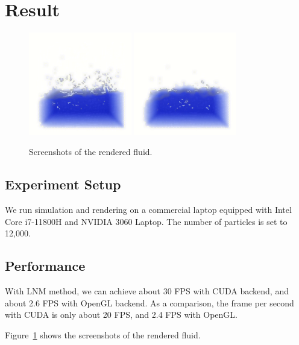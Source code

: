 \documentclass[sigconf]{acmart}
\begin{document}
\section{Result}
\begin{figure}[htb]
  \centering
  \includegraphics[width=0.4\textwidth]{result-1.png}
  \hspace{5em}
  \includegraphics[width=0.4\textwidth]{result-2.png}
  \caption{Screenshots of the rendered fluid.}
  \label{rendered-result}
\end{figure}

\subsection{Experiment Setup}
We run simulation and rendering on a commercial laptop equipped with Intel Core i7-11800H and NVIDIA 3060 Laptop. The number of particles is set to 12,000.

\subsection{Performance}
With LNM method, we can achieve about 30 FPS with CUDA backend, and about 2.6 FPS with OpenGL backend. As a comparison, the frame per second with CUDA is only about 20 FPS, and 2.4 FPS with OpenGL.

Figure~\ref{rendered-result} shows the screenshots of the rendered fluid.
\end{document}
